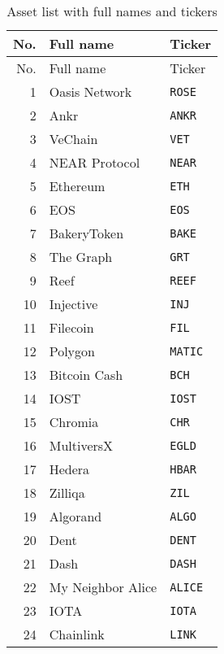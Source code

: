 \begin{longtable}{@{}rll@{}}
\caption{Asset list with full names and tickers}\label{tab:assets}\\
\toprule
No. & Full name & Ticker \\
\midrule
\endfirsthead
\toprule
No. & Full name & Ticker \\
\midrule
\endhead
\bottomrule
\endfoot

1  & Oasis Network        & \texttt{ROSE} \\
2  & Ankr                 & \texttt{ANKR} \\
3  & VeChain              & \texttt{VET} \\
4  & NEAR Protocol        & \texttt{NEAR} \\
5  & Ethereum             & \texttt{ETH} \\
6  & EOS                  & \texttt{EOS} \\
7  & BakeryToken          & \texttt{BAKE} \\
8  & The Graph            & \texttt{GRT} \\
9  & Reef                 & \texttt{REEF} \\
10 & Injective            & \texttt{INJ} \\
11 & Filecoin             & \texttt{FIL} \\
12 & Polygon              & \texttt{MATIC} \\
13 & Bitcoin Cash         & \texttt{BCH} \\
14 & IOST                 & \texttt{IOST} \\
15 & Chromia              & \texttt{CHR} \\
16 & MultiversX           & \texttt{EGLD} \\
17 & Hedera               & \texttt{HBAR} \\
18 & Zilliqa              & \texttt{ZIL} \\
19 & Algorand             & \texttt{ALGO} \\
20 & Dent                 & \texttt{DENT} \\
21 & Dash                 & \texttt{DASH} \\
22 & My Neighbor Alice    & \texttt{ALICE} \\
23 & IOTA                 & \texttt{IOTA} \\
24 & Chainlink            & \texttt{LINK} \\

\end{longtable}
